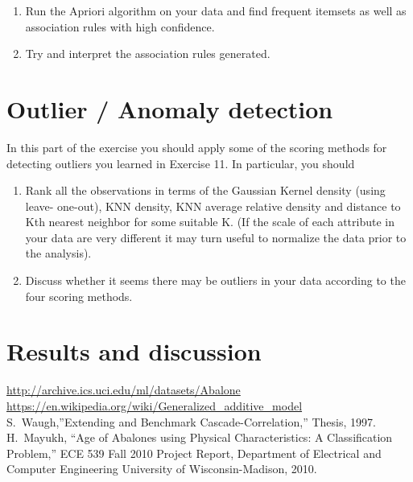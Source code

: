 \documentclass[10pt, paper=a4]{article}
\begin{document}
\begin{enumerate}
\item Run the Apriori algorithm on your data and find frequent itemsets as well
  as association rules with high confidence.
\item Try and interpret the association rules generated.
\end{enumerate}

\section{Outlier / Anomaly detection}
\label{sec:detection}
In this part of the exercise you should apply some of the scoring methods for
detecting outliers you learned in Exercise 11.  In particular, you should

\begin{enumerate}
  \item Rank all the observations in terms of the Gaussian Kernel density (using
    leave- one-out), KNN density, KNN average relative density and distance to
    Kth nearest neighbor for some suitable K. (If the scale of each attribute in
    your data are very different it may turn useful to normalize the data prior
    to the analysis).
  \item Discuss whether it seems there may be outliers in your data according to
    the four scoring methods.
\end{enumerate}

\section{Results and discussion}
\label{sec:results_and_discussion}

\begin{thebibliography}{10}
 \url{http://archive.ics.uci.edu/ml/datasets/Abalone}
 \url{https://en.wikipedia.org/wiki/Generalized_additive_model}
 S.~Waugh,''Extending and Benchmark Cascade-Correlation,''
  Thesis, 1997.
 H.~Mayukh, ``Age of Abalones using Physical
  Characteristics: A Classification Problem,'' ECE 539 Fall 2010
  Project Report, Department of Electrical and Computer Engineering
  University of Wisconsin-Madison, 2010.
\end{thebibliography}
\end{document}
